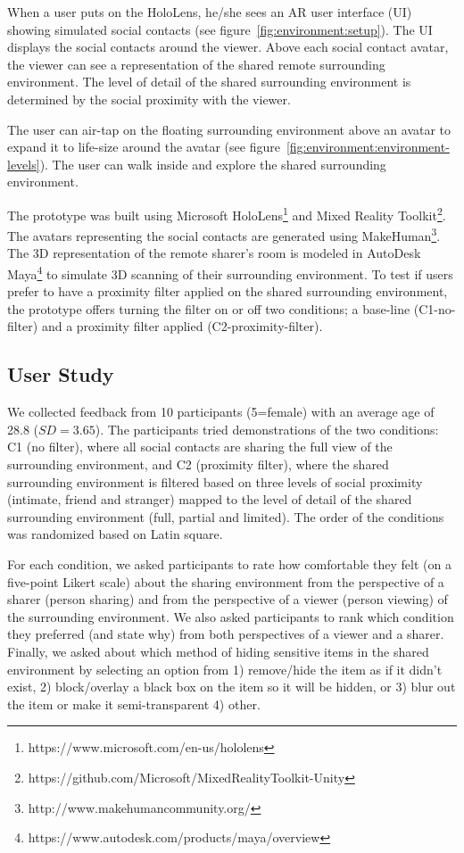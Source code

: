 When a user puts on the HoloLens, he/she sees an AR user interface (UI) showing simulated social contacts (see figure~\ref{fig:environment:setup}). The UI displays the social contacts around the viewer. Above each social contact avatar, the viewer can see a representation of the shared remote surrounding environment. The level of detail of the shared surrounding environment is determined by the social proximity with the viewer.

The user can air-tap on the floating surrounding environment above an avatar to expand it to life-size around the avatar (see figure~\ref{fig:environment:environment-levels}). The user can walk inside and explore the shared surrounding environment.

The prototype was built using Microsoft HoloLens\footnote{https://www.microsoft.com/en-us/hololens} and Mixed Reality Toolkit\footnote{https://github.com/Microsoft/MixedRealityToolkit-Unity}. The avatars representing the social contacts are generated using MakeHuman\footnote{http://www.makehumancommunity.org/}. The 3D representation of the remote sharer's room is modeled in AutoDesk Maya\footnote{https://www.autodesk.com/products/maya/overview} to simulate 3D scanning of their surrounding environment. To test if users prefer to have a proximity filter applied on the shared surrounding environment, the prototype offers turning the filter on or off two conditions; a base-line (C1-no-filter) and a proximity filter applied (C2-proximity-filter).


\subsection{User Study}

We collected feedback from 10 participants (5=female) with an average age of 28.8 ($SD=3.65$). The participants tried demonstrations of the two conditions: C1 (no filter), where all social contacts are sharing the full view of the surrounding environment, and C2 (proximity filter), where the shared surrounding environment is filtered based on three levels of social proximity (intimate, friend and stranger) mapped to the level of detail of the shared surrounding environment (full, partial and limited). The order of the conditions was randomized based on Latin square. 

For each condition, we asked participants to rate how comfortable they felt (on a five-point Likert scale) about the sharing environment from the perspective of a sharer (person sharing) and from the perspective of a viewer (person viewing) of the surrounding environment. We also asked participants to rank which condition they preferred (and state why) from both perspectives of a viewer and a sharer. Finally, we asked about which method of hiding sensitive items in the shared environment by selecting an option from 1) remove/hide the item as if it didn't exist, 2) block/overlay a black box on the item so it will be hidden, or 3) blur out the item or make it semi-transparent 4) other. 

